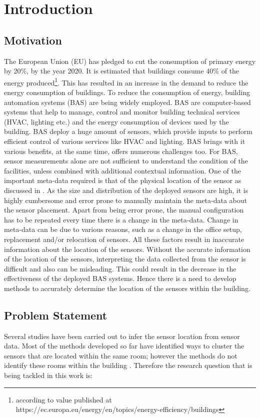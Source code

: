 \chapter{Introduction}
\label{chp:introduction}
\section{Motivation}
The European Union (EU) has pledged to cut the consumption of primary energy by 20\%, by the year 2020.  It is estimated that buildings consume 40\% of the energy produced\footnote{according to value published at https://ec.europa.eu/energy/en/topics/energy-efficiency/buildings }.  This has resulted in an increase in the demand to reduce the energy consumption of buildings. To reduce the consumption of energy, building automation systems (BAS) are being widely employed. BAS are computer-based systems that help to manage, control and monitor building technical services (HVAC, lighting etc.) and the energy consumption of devices used by the building.  BAS deploy a huge amount of sensors, which provide inputs to perform efficient control of various services like HVAC and lighting. BAS brings with it various benefits, at the same time, offers numerous challenges too. For BAS, sensor measurements alone are not sufficient to understand the condition of the facilities, unless combined with additional contextual information. One of the important meta-data required is that of the physical location of the sensor as discussed in  \cite{liu2009requirements}.
As the size and distribution of the deployed sensors are high, it is highly cumbersome and error prone to manually maintain the meta-data about the sensor placement. Apart from being error prone, the manual configuration has to be repeated every time there is a change in the meta-data. Change in meta-data can be due to various reasons, such as a change in the office setup, replacement and/or relocation of sensors. All these factors result in inaccurate information about the location of the sensors. Without the accurate information of the location of the sensors, interpreting the data collected from the sensor is difficult and also can be misleading. This could result in the decrease in the effectiveness of the deployed BAS systems. Hence there is a need to develop methods to accurately determine the location of the sensors within the building.

\section{Problem Statement}
Several studies have been carried out to infer the sensor location from sensor data. Most of the methods developed so far have identified ways to cluster the sensors that are located within the same room; however the methods do not identify these rooms within the building \cite{doi:10.1061/9780784413616.226}.  Therefore the research question that is being tackled in this work is:

